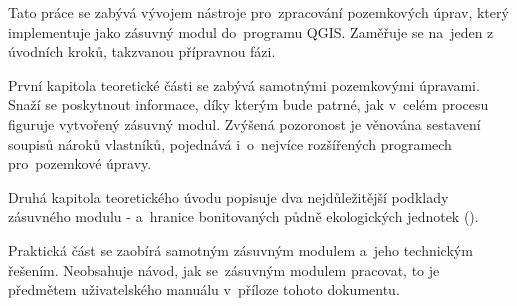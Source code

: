Tato práce se zabývá vývojem nástroje pro~zpracování pozemkových úprav, který implementuje jako zásuvný modul do~programu QGIS. Zaměřuje se na~jeden z úvodních kroků, takzvanou přípravnou fázi.

První kapitola teoretické části se zabývá samotnými pozemkovými úpravami. Snaží se poskytnout informace, díky kterým bude patrné, jak v~celém procesu figuruje vytvořený zásuvný modul. Zvýšená pozoronost je věnována sestavení soupisů nároků vlastníků, pojednává i~o~nejvíce rozšířených programech pro~pozemkové úpravy.

Druhá kapitola teoretického úvodu popisuje dva nejdůležitější podklady zásuvného modulu -  a~hranice bonitovaných půdně ekologických jednotek ().

Praktická část se zaobírá samotným zásuvným modulem a~jeho technickým řešením. Neobsahuje návod, jak se~zásuvným modulem pracovat, to je předmětem uživatelského manuálu v~příloze tohoto dokumentu.
